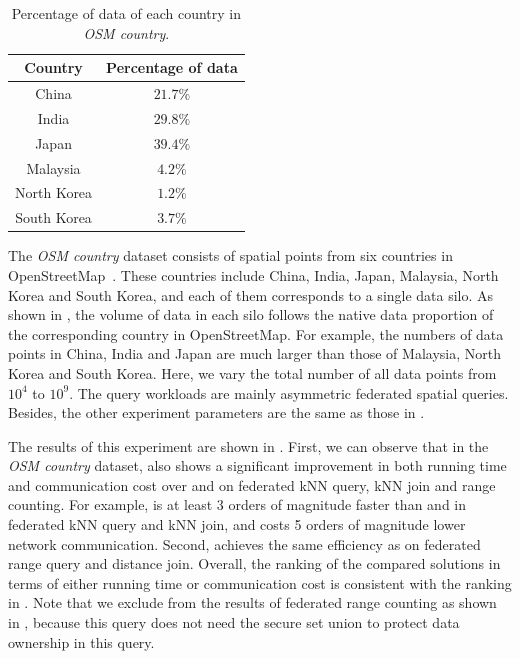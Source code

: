 \begin{table}[t]
    \centering
    \caption{Percentage of data of each country in \textit{OSM country}.}
    \begin{tabular}{cc}
		\toprule
		Country & Percentage of data  \\
		\midrule
		China             & $21.7\%$        \\
		India             & $29.8\%$        \\
		Japan             & $39.4\%$        \\
		Malaysia          & $4.2\%$         \\
		North Korea       & $1.2\%$         \\
		South Korea       & $3.7\%$         \\
		\bottomrule
    \end{tabular}
    \label{tab:country}
\end{table}

The \textit{OSM country} dataset consists of spatial points from six countries in OpenStreetMap~\cite{osm}. These countries include China, India, Japan, Malaysia, North Korea and South Korea, and each of them corresponds to a single data silo. As shown in , the volume of data in each silo follows the native data proportion of the corresponding country in OpenStreetMap. For example, the numbers of data points in China, India and Japan are much larger than those of Malaysia, North Korea and South Korea. Here, we vary the total number of all data points from $10^4$ to $10^9$. 
The query workloads are mainly asymmetric federated spatial queries.
Besides, the other experiment parameters are the same as those in .

The results of this experiment are shown in . First, we can observe that in the \textit{OSM country} dataset, \sysname also shows a significant improvement in both running time and communication cost over \conclave and \conclaveext on federated kNN query, kNN join and range counting. For example, \sysname is at least 3 orders of magnitude faster than \conclave and \conclaveext in federated kNN query and kNN join, and costs 5 orders of magnitude lower network communication. Second, \sysname achieves the same efficiency as \conclaveext on federated range query and distance join. Overall, the ranking of the compared solutions in terms of either running time or communication cost is consistent with the ranking in . Note that we exclude \conclaveext from the results of federated range counting as shown in , because this query does not need the secure set union to protect data ownership in this query.

